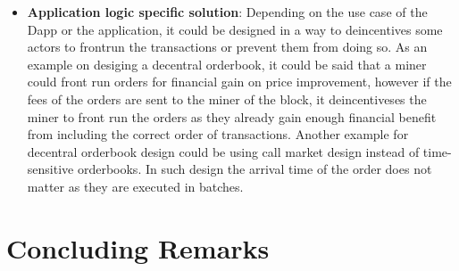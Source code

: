 \begin{itemize}
\item{\textbf{Application logic specific solution}: Depending on the use case of  the Dapp or the application, it could be designed in a way to deincentives some actors to frontrun the transactions or prevent them from doing so. As an example on desiging a decentral orderbook, it could be said that a miner could front run orders for financial gain on price improvement, however if the fees of the orders are sent to the miner of the block, it deincentiveses the miner to front run the orders as they already gain enough financial benefit from including the correct order of transactions. 
Another example for decentral orderbook design could be using call market design instead of  time-sensitive orderbooks. In such design the arrival time of the order does not matter as they are executed in batches. }


\end{itemize}







\section{Concluding Remarks}




